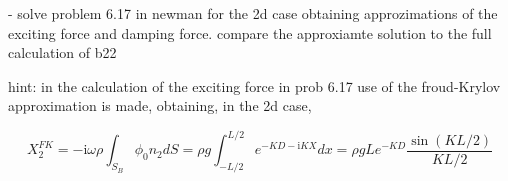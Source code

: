 - solve problem 6.17 in newman for the 2d case obtaining approzimations of the exciting force and damping force. compare the approxiamte solution to the full calculation of b22

hint: in the calculation of the exciting force in prob 6.17 use of the froud-Krylov approximation is made, obtaining, in the 2d case, 


\begin{equation}
	X_2^{FK} = - \mathrm{i} \omega \rho \int_{S_B} \phi_0 n_2 dS =\rho g \int_{-L/2}^{L/2} e^{-KD- \mathrm{i}KX} dx = \rho g L e^{-KD} \frac{\sin(KL/2)}{KL/2} 
\end{equation}







